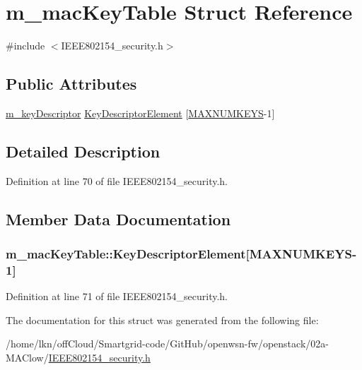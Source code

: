 \hypertarget{structm__mac_key_table}{}\section{m\+\_\+mac\+Key\+Table Struct Reference}
\label{structm__mac_key_table}


{\ttfamily \#include $<$I\+E\+E\+E802154\+\_\+security.\+h$>$}

\subsection*{Public Attributes}
\begin{DoxyCompactItemize}
\item 
\hyperlink{structm__key_descriptor}{m\+\_\+key\+Descriptor} \hyperlink{structm__mac_key_table_a307a8ce28f823efa6a8bb472b6ce9681}{Key\+Descriptor\+Element} \mbox{[}\hyperlink{group___i_e_e_e802154_ga344024978aad7388feba040dc0d9e864}{M\+A\+X\+N\+U\+M\+K\+E\+YS}-\/1\mbox{]}
\end{DoxyCompactItemize}


\subsection{Detailed Description}


Definition at line 70 of file I\+E\+E\+E802154\+\_\+security.\+h.



\subsection{Member Data Documentation}
\subsubsection[{\texorpdfstring{Key\+Descriptor\+Element}{KeyDescriptorElement}}]{ m\+\_\+mac\+Key\+Table\+::\+Key\+Descriptor\+Element\mbox{[}{\bf M\+A\+X\+N\+U\+M\+K\+E\+YS}-\/1\mbox{]}}\hypertarget{structm__mac_key_table_a307a8ce28f823efa6a8bb472b6ce9681}{}\label{structm__mac_key_table_a307a8ce28f823efa6a8bb472b6ce9681}


Definition at line 71 of file I\+E\+E\+E802154\+\_\+security.\+h.



The documentation for this struct was generated from the following file\+:\begin{DoxyCompactItemize}
\item 
/home/lkn/off\+Cloud/\+Smartgrid-\/code/\+Git\+Hub/openwsn-\/fw/openstack/02a-\/\+M\+A\+Clow/\hyperlink{_i_e_e_e802154__security_8h}{I\+E\+E\+E802154\+\_\+security.\+h}\end{DoxyCompactItemize}

